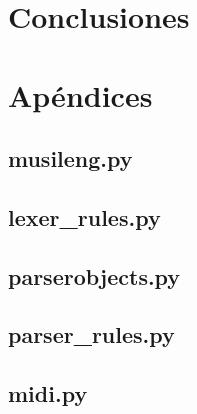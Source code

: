 \documentclass[a4paper, 10pt, twoside]{article}
\begin{document}
\section{Conclusiones}

\newpage

\section{Apéndices}

\subsection{musileng.py}

\newpage

\subsection{lexer\_rules.py}

\newpage

\subsection{parserobjects.py}

\newpage

\subsection{parser\_rules.py}

\newpage

\subsection{midi.py}

\end{document}
